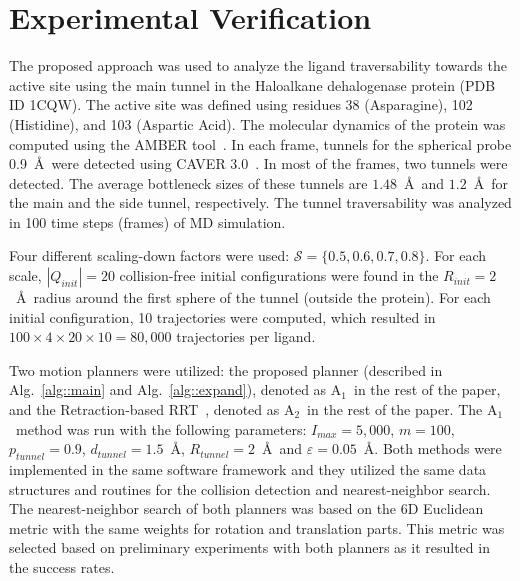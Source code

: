 \documentclass[usletter, 10pt, conference]{ieeeconf} %
\def\dt{d_{tunnel}}
\def\QI{Q_{init}}
\def\RI{R_{init}}
\def\rv{R_{tunnel}}
\def\Imax{I_{max}} %
\def\gb{p_{tunnel}}
\def\S{\mathcal{S}}
\def\RA{A$_{1}$}
\def\RB{A$_{2}$}
\begin{document}
\section{Experimental Verification}

The proposed approach was used to analyze the ligand traversability towards the active site using the main tunnel in the Haloalkane dehalogenase protein (PDB ID 1CQW).
The active site was defined using residues 38 (Asparagine), 102 (Histidine), and 103 (Aspartic Acid).
The molecular dynamics of the protein was computed using the AMBER tool~\cite{amber}.
In each frame, tunnels for the spherical probe 0.9~\AA\ were detected using CAVER 3.0~\cite{caver3}. 
In most of the frames, two tunnels were detected.
The average bottleneck sizes of these tunnels are $1.48$~\AA\ and $1.2$~\AA\ for the main and the side tunnel, respectively.
The tunnel traversability was analyzed in 100 time steps (frames) of MD simulation.

Four different scaling-down factors were used: $\S=\{0.5,0.6,0.7,0.8\}$.
For each scale, $|\QI|=20$ collision-free initial configurations were found in the $\RI=2$~\AA\ radius around the first sphere of the tunnel (outside the protein).
For each initial configuration, 10 trajectories were computed, which resulted
in $100 \times 4 \times 20 \times 10 = 80,000$ trajectories per ligand.

Two motion planners were utilized: the proposed planner (described in Alg.~\ref{alg::main} and Alg.~\ref{alg::expand}), denoted as \RA\ in the rest of the paper, and the Retraction-based RRT~\cite{zhangRetraction}, denoted as \RB\ in the rest of the paper.
The \RA\ method was run with the following parameters:
$\Imax=5,000$, $m=100$, $\gb=0.9$, $\dt=1.5$~\AA, $\rv=2$~\AA\ and $\varepsilon=0.05$~\AA.
Both methods were implemented in the same software framework and they utilized the same data structures and routines for the collision detection and nearest-neighbor search.
The nearest-neighbor search of both planners was based on the 6D Euclidean metric with the same weights for rotation and translation parts.
This metric was selected based on preliminary experiments with both planners as it resulted in the success rates.
\end{document}
